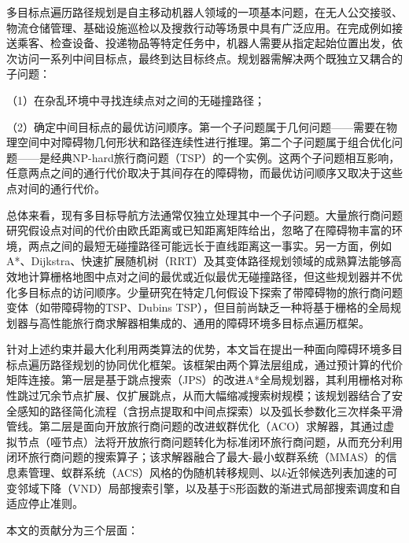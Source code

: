 \documentclass[lettersize,journal]{IEEEtran}
\begin{document}
多目标点遍历路径规划是自主移动机器人领域的一项基本问题，在无人公交接驳、物流仓储管理、基础设施巡检以及搜救行动等场景中具有广泛应用\cite{ref1,ref2}。在完成例如接送乘客、检查设备、投递物品等特定任务中，机器人需要从指定起始位置出发，依次访问一系列中间目标点，最终到达目标终点。规划器需解决两个既独立又耦合的子问题：

（1）在杂乱环境中寻找连续点对之间的无碰撞路径；

（2）确定中间目标点的最优访问顺序。第一个子问题属于几何问题——需要在物理空间中对障碍物几何形状和路径连续性进行推理。第二个子问题属于组合优化问题——是经典NP-hard旅行商问题（TSP）的一个实例。这两个子问题相互影响，任意两点之间的通行代价取决于其间存在的障碍物，而最优访问顺序又取决于这些点对间的通行代价。

总体来看，现有多目标导航方法通常仅独立处理其中一个子问题。大量旅行商问题研究假设点对间的代价由欧氏距离或已知距离矩阵给出\cite{ref3,ref4}，忽略了在障碍物丰富的环境，两点之间的最短无碰撞路径可能远长于直线距离这一事实。另一方面，例如A*、Dijkstra、快速扩展随机树（RRT）及其变体路径规划领域的成熟算法能够高效地计算栅格地图中点对之间的最优或近似最优无碰撞路径，但这些规划器并不优化多目标点的访问顺序\cite{ref5,ref6,ref7}。少量研究在特定几何假设下探索了带障碍物的旅行商问题变体（如带障碍物的TSP、Dubins TSP），但目前尚缺乏一种将基于栅格的全局规划器与高性能旅行商求解器相集成的、通用的障碍环境多目标点遍历框架。

针对上述约束并最大化利用两类算法的优势，本文旨在提出一种面向障碍环境多目标点遍历路径规划的协同优化框架。该框架由两个算法层组成，通过预计算的代价矩阵连接。第一层是基于跳点搜索（JPS）的改进A*全局规划器，其利用栅格对称性跳过冗余节点扩展、仅扩展跳点，从而大幅缩减搜索树规模；该规划器结合了安全感知的路径简化流程（含拐点提取和中间点探索）以及弧长参数化三次样条平滑管线。第二层是面向开放旅行商问题的改进蚁群优化（ACO）求解器，其通过虚拟节点（哑节点）法将开放旅行商问题转化为标准闭环旅行商问题，从而充分利用闭环旅行商问题的搜索算子；该求解器融合了最大-最小蚁群系统（MMAS）的信息素管理、蚁群系统（ACS）风格的伪随机转移规则、以$k$近邻候选列表加速的可变邻域下降（VND）局部搜索引擎，以及基于S形函数的渐进式局部搜索调度和自适应停止准则。

本文的贡献分为三个层面：
\end{document}
